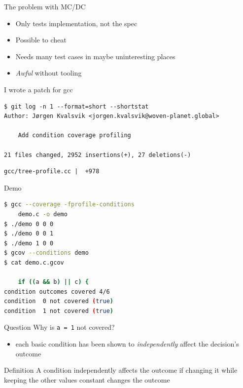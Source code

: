 \documentclass[xcolor = {dvipsnames, table}]{beamer}
\begin{document}
\begin{frame}
    The problem with MC/DC

    \begin{itemize}
        \item Only tests implementation, not the spec
        \item Possible to cheat
        \item Needs many test cases in maybe uninteresting places
        \item \emph{Awful} without tooling
    \end{itemize}
\end{frame}

\begin{frame}[fragile]
    I wrote a patch for gcc

    \begin{Verbatim}[fontsize = \footnotesize]
$ git log -n 1 --format=short --shortstat
Author: Jørgen Kvalsvik <jorgen.kvalsvik@woven-planet.global>

    Add condition coverage profiling

21 files changed, 2952 insertions(+), 27 deletions(-)
    \end{Verbatim}

    \begin{Verbatim}[fontsize=\footnotesize]
 gcc/tree-profile.cc |  +978
    \end{Verbatim}
\end{frame}

\begin{frame}[fragile]
    \begin{block}{Demo}
        \begin{lstlisting}[language = sh, basicstyle = \scriptsize\ttfamily]
$ gcc --coverage -fprofile-conditions
    demo.c -o demo
$ ./demo 0 0 0
$ ./demo 0 0 1
$ ./demo 1 0 0
$ gcov --conditions demo
$ cat demo.c.gcov

    if ((a && b) || c) {
condition outcomes covered 4/6
condition  0 not covered (true)
condition  1 not covered (true)
        \end{lstlisting}
    \end{block}

    \begin{block}{Question}
        Why is \lstinline{a = 1} not covered?
    \end{block}
\end{frame}

\begin{frame}
    \begin{itemize}
        \item each basic condition has been shown to \emph{independently}
              affect the decision’s outcome
    \end{itemize}

    \begin{block}{Definition}
        A condition independently affects the outcome if changing it while
        keeping the other values constant changes the outcome
    \end{block}
\end{frame}
\end{document}
